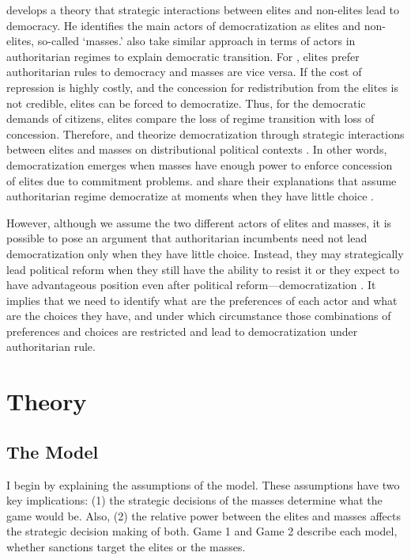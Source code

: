 \documentclass[11pt]{article}
\begin{document}
\citet{Boix2003} develops a theory that strategic interactions between elites and non-elites lead to democracy. He identifies the main actors of democratization as elites and non-elites, so-called `masses.' \citet{Acemoglu2006a} also take similar approach in terms of actors in authoritarian regimes to explain democratic transition. For \citet{Acemoglu2006a}, elites prefer authoritarian rules to democracy and masses are vice versa. If the cost of repression is highly costly, and the concession for redistribution from the elites is not credible, elites can be forced to democratize. Thus, for the democratic demands of citizens, elites compare the loss of regime transition with loss of concession. Therefore, \citet{Boix2003} and \citet{Acemoglu2006a} theorize democratization through strategic interactions between elites and masses on distributional political contexts \citep{Haggard2012a}. In other words, democratization emerges when masses have enough power to enforce concession of elites due to commitment problems. \citet{Boix2003} and \citet{Acemoglu2006a} share their explanations that assume authoritarian regime democratize at moments when they have little
choice \citep{Riedl2020}.

However, although we assume the two different actors of elites and masses, it is possible to pose an argument that authoritarian incumbents need not lead democratization only when they have little choice. Instead, they may strategically lead political reform when they still have the ability to resist it \citep{Riedl2020} or they expect to have advantageous position  even after political reform---democratization \citep{Albertus2017}. It implies that we need to identify what are the preferences of each actor and what are the choices they have, and under which circumstance those combinations of preferences and choices are restricted and lead to democratization under authoritarian rule.



\section*{Theory}
\subsection*{The Model}
I begin by explaining the assumptions of the model. These assumptions have two key implications: (1) the strategic decisions of the masses determine what the game would be. Also, (2) the relative power between the elites and masses affects the strategic decision making of both. Game 1 and Game 2 describe each model, whether sanctions target the elites or the masses.
	
\end{document}
